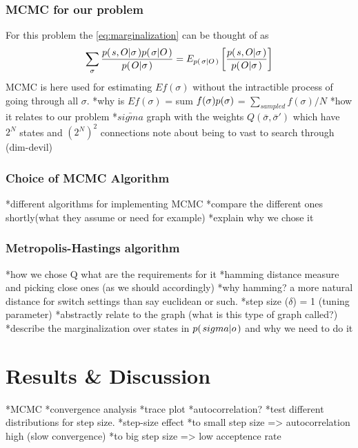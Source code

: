 \documentclass[a4paper,11pt]{kth-mag}
\begin{document}
           \subsection{MCMC for our problem} 
                For this problem the \eqref{eq:marginalization} can be thought of as
                \begin{equation}
                    \sum\limits_\sigma
                    \frac{
                        p{(\left. s,O \middle\vert \sigma \right.)}p{(\left. \sigma \middle\vert O \right.)}
                    }{
                        p{(\left. O \middle\vert \sigma \right.)}
                    }
                    = E_{p{(\left. \sigma \middle\vert O \right.)}}\left[{
                        \frac{
                            p{(\left. s,O \middle\vert \sigma \right.)}
                        }{
                            p{(\left. O \middle\vert \sigma \right.)}
                        }
                    }\right]
                \end{equation}
                MCMC is here used for estimating $E{f(\sigma)}$ without the intractible 
                process of going through all $\sigma$.
                *why is $E{f(\sigma)}$ = 
                sum $f(\sigma)p{(\sigma)}$ = $\sum_{sampled} f(\sigma)/N$
                *how it relates to our problem
                    *$\bar{sigma}$ graph with the weights $Q(\bar{\sigma},\bar{\sigma}')$
                    which have $2^N$ states and $(2^N)^2$ connections
                    note about being to vast to search through (dim-devil)
            \subsection{Choice of MCMC Algorithm}
                *different algorithms for implementing MCMC
                *compare the different ones shortly(what they assume or
                need for example)
                *explain why we chose it
            \subsection{Metropolis-Hastings algorithm}
                *how we chose Q what are the requirements for it
                    *hamming distance measure and picking close ones (as we should
                    accordingly)
                    *why hamming? a more natural distance for switch settings than
                    say euclidean or such.
                    *step size ($\delta$) = 1 (tuning parameter)
                *abstractly relate to the graph (what is this type of graph
                called?)
            *describe the marginalization over states in $p{(\left. sigma \middle\vert o \right.)}$ and why we need
            to do it


    \chapter{Results \& Discussion}
        *MCMC
            *convergence analysis
                *trace plot
                *autocorrelation?
                *test different distributions for step size.
                    *step-size effect
                        *to small step size => autocorrelation high (slow convergence)
                        *to big step size => low acceptence rate
\end{document}
